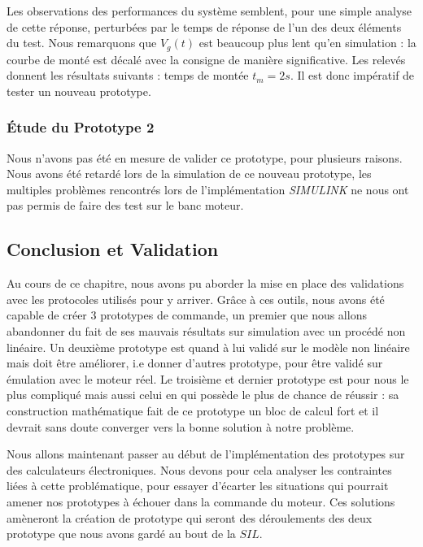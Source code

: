 Les observations des performances du système semblent, pour une simple analyse de cette réponse, perturbées par le temps de réponse de l'un des deux éléments du test. Nous remarquons que $V_g(t)$ est beaucoup plus lent qu'en simulation : la courbe de monté est décalé avec la consigne de manière significative. Les relevés donnent les résultats suivants : temps de montée $t_m = 2s$. Il est donc impératif de tester un nouveau prototype. 

\subsubsection{Étude du Prototype 2}
Nous n'avons pas été en mesure de valider ce prototype, pour plusieurs raisons. Nous avons été retardé lors de la simulation de ce nouveau prototype, les multiples problèmes rencontrés lors de l'implémentation \emph{SIMULINK} ne nous ont pas permis de faire des test sur le banc moteur. 

\subsection{Conclusion et Validation}
Au cours de ce chapitre, nous avons pu aborder la mise en place des validations avec les protocoles utilisés pour y arriver. Grâce à ces outils, nous avons été capable de créer 3 prototypes de commande, un premier que nous allons abandonner du fait de ses mauvais résultats sur simulation avec un procédé non linéaire. Un deuxième prototype est quand à lui validé sur le modèle non linéaire mais doit être améliorer, i.e donner d'autres prototype, pour être validé sur émulation avec le moteur réel. Le troisième et dernier prototype est pour nous le plus compliqué mais aussi celui en qui possède le plus de chance de réussir : sa construction mathématique fait de ce prototype un bloc de calcul fort et il devrait sans doute converger vers la bonne solution à notre problème.


Nous allons maintenant passer au début de l'implémentation des prototypes sur des calculateurs électroniques. Nous devons pour cela analyser les contraintes liées à cette problématique, pour essayer d'écarter les situations qui pourrait amener nos prototypes à échouer dans la commande du moteur. Ces solutions amèneront la création de prototype qui seront des déroulements des deux prototype que nous avons gardé au bout de la $SIL$.






